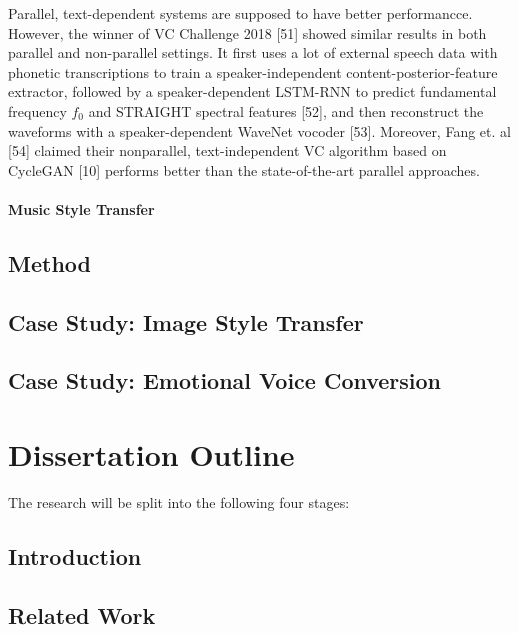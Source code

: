 \documentclass{article}
\begin{document}
Parallel, text-dependent systems are supposed to have better performancce. However, the winner of VC Challenge 2018 [51] showed similar results in both parallel and non-parallel settings. It first uses a lot of external speech data with phonetic transcriptions to train a speaker-independent content-posterior-feature extractor, followed by a speaker-dependent LSTM-RNN to predict fundamental frequency $f_0$ and STRAIGHT spectral features [52], and then reconstruct the waveforms with a speaker-dependent WaveNet vocoder [53]. Moreover, Fang et. al [54] claimed their nonparallel, text-independent VC algorithm based on CycleGAN [10] performs better than the state-of-the-art parallel approaches.


\paragraph{Music Style Transfer}



\subsection{Method}

\subsection{Case Study: Image Style Transfer}

\subsection{Case Study: Emotional Voice Conversion}



\section{Dissertation Outline}
\label{Sec:Outline}

The research will be split into the following four stages:

\subsection{Introduction}

\subsection{Related Work}
\end{document}
